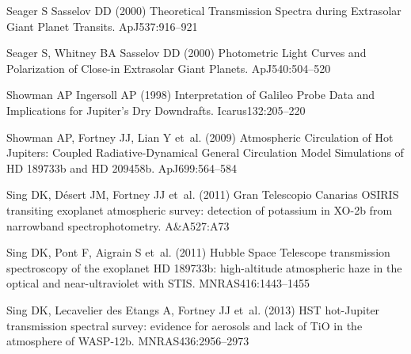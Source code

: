 \documentclass[graybox,natbib,nosecnum]{svmult}
\newcommand*\aap{A\&A}
\newcommand*\apj{ApJ}
\newcommand*\icarus{Icarus}
\newcommand*\mnras{MNRAS}
\begin{document}
\begin{thebibliography}{110}
{Seager} S {Sasselov} DD (2000) {Theoretical Transmission Spectra during
  Extrasolar Giant Planet Transits}. \apj 537:916--921

{Seager} S, {Whitney} BA {Sasselov} DD (2000) {Photometric Light Curves and
  Polarization of Close-in Extrasolar Giant Planets}. \apj 540:504--520

{Showman} AP {Ingersoll} AP (1998) {Interpretation of Galileo Probe Data and
  Implications for Jupiter's Dry Downdrafts}. \icarus 132:205--220

{Showman} AP, {Fortney} JJ, {Lian} Y et~al. (2009) {Atmospheric Circulation of
  Hot Jupiters: Coupled Radiative-Dynamical General Circulation Model
  Simulations of HD 189733b and HD 209458b}. \apj 699:564--584

{Sing} DK, {D{\'e}sert} JM, {Fortney} JJ et~al. (2011{}) {Gran
  Telescopio Canarias OSIRIS transiting exoplanet atmospheric survey: detection
  of potassium in XO-2b from narrowband spectrophotometry}. \aap 527:A73

{Sing} DK, {Pont} F, {Aigrain} S et~al. (2011{}) {Hubble Space
  Telescope transmission spectroscopy of the exoplanet HD 189733b:
  high-altitude atmospheric haze in the optical and near-ultraviolet with
  STIS}. \mnras 416:1443--1455

{Sing} DK, {Lecavelier des Etangs} A, {Fortney} JJ et~al. (2013) {HST
  hot-Jupiter transmission spectral survey: evidence for aerosols and lack of
  TiO in the atmosphere of WASP-12b}. \mnras 436:2956--2973


\end{thebibliography}
\end{document}
